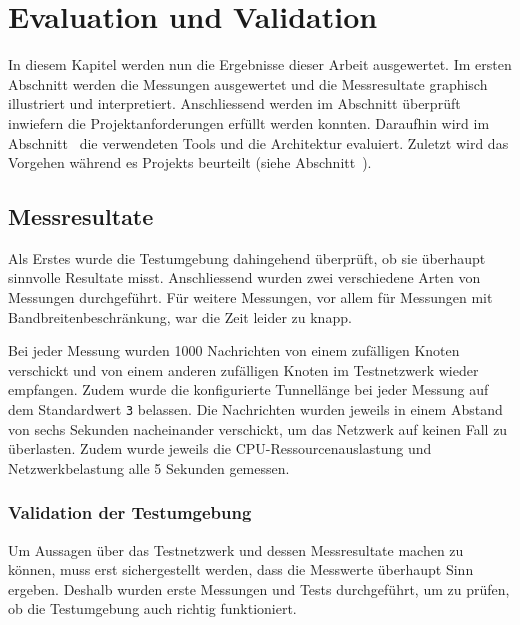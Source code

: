 \chapter{Evaluation und Validation}
\label{ch:evaluation}


In diesem Kapitel werden nun die Ergebnisse dieser Arbeit ausgewertet.
Im ersten Abschnitt  werden die Messungen
ausgewertet und die Messresultate graphisch illustriert und interpretiert.
Anschliessend werden im Abschnitt  überprüft inwiefern die Projektanforderungen erfüllt werden konnten.
Daraufhin wird im Abschnitt~ die verwendeten Tools und die Architektur evaluiert.
Zuletzt wird das Vorgehen während es Projekts beurteilt (siehe Abschnitt~).

\section{Messresultate}\label{sec:messresultate}

Als Erstes wurde die Testumgebung dahingehend überprüft, ob sie überhaupt sinnvolle Resultate misst.
Anschliessend wurden zwei verschiedene Arten von Messungen durchgeführt.
Für weitere Messungen, vor allem für Messungen mit Bandbreitenbeschränkung, war die Zeit leider zu knapp.

Bei jeder Messung wurden 1000 Nachrichten von einem zufälligen Knoten verschickt
und von einem anderen zufälligen Knoten im Testnetzwerk wieder empfangen.
Zudem wurde die konfigurierte Tunnellänge bei jeder Messung auf dem Standardwert \lstinline|3| belassen.
Die Nachrichten wurden jeweils in einem Abstand von sechs Sekunden nacheinander verschickt,
um das Netzwerk auf keinen Fall zu überlasten.
Zudem wurde jeweils die CPU-Ressourcenauslastung und Netzwerkbelastung alle 5 Sekunden gemessen.

\subsection{Validation der Testumgebung}\label{sec:validation_testumgebung}

Um Aussagen über das Testnetzwerk und dessen Messresultate machen zu können,
muss erst sichergestellt werden, dass die Messwerte überhaupt Sinn ergeben.
Deshalb wurden erste Messungen und Tests durchgeführt, um zu prüfen, ob die Testumgebung auch richtig funktioniert.

